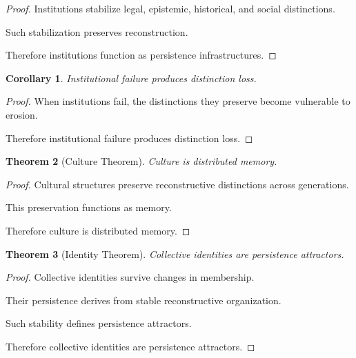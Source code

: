 \documentclass[12pt,oneside]{article}
\newtheorem{theorem}{Theorem}[section] \newtheorem{lemma}[theorem]{Lemma} \newtheorem{proposition}[theorem]{Proposition} \newtheorem{corollary}[theorem]{Corollary}
\theoremstyle{definition}
\begin{document}
\begin{proof}

Institutions stabilize legal, epistemic, historical, and social distinctions.

Such stabilization preserves reconstruction.

Therefore institutions function as persistence infrastructures.

\end{proof}

\begin{corollary}

Institutional failure produces distinction loss.

\end{corollary}

\begin{proof}

When institutions fail, the distinctions they preserve become vulnerable to erosion.

Therefore institutional failure produces distinction loss.

\end{proof}

\begin{theorem}[Culture Theorem]

Culture is distributed memory.

\end{theorem}

\begin{proof}

Cultural structures preserve reconstructive distinctions across generations.

This preservation functions as memory.

Therefore culture is distributed memory.

\end{proof}

\begin{theorem}[Identity Theorem]

Collective identities are persistence attractors.

\end{theorem}

\begin{proof}

Collective identities survive changes in membership.

Their persistence derives from stable reconstructive organization.

Such stability defines persistence attractors.

Therefore collective identities are persistence attractors.

\end{proof}
\end{document}
